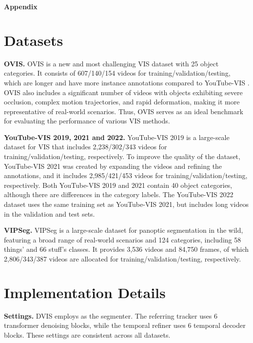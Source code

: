 \documentclass[10pt,twocolumn,letterpaper]{article}
\begin{document}
{\small


}

\clearpage
\appendix
\begin{center}{\bf \Large Appendix}\end{center}\vspace{-2mm}
\renewcommand{\thetable}{\Roman{table}}
\renewcommand{\thefigure}{\Roman{figure}}
\setcounter{table}{0}
\setcounter{figure}{0}

\section{Datasets}\label{sec:datasets}

\textbf{OVIS.} OVIS \cite{ovis} is a new and most challenging VIS dataset with 25 object categories. It consists of 607/140/154 videos for training/validation/testing, which are longer and have more instance annotations compared to YouTube-VIS \cite{masktrackrcnn}. OVIS also includes a significant number of videos with objects exhibiting severe occlusion, complex motion trajectories, and rapid deformation, making it more representative of real-world scenarios. Thus, OVIS serves as an ideal benchmark for evaluating the performance of various VIS methods.

\textbf{YouTube-VIS 2019, 2021 and 2022.} YouTube-VIS 2019 is a large-scale dataset for VIS that includes 2,238/302/343 videos for training/validation/testing, respectively. To improve the quality of the dataset, YouTube-VIS 2021 was created by expanding the videos and refining the annotations, and it includes 2,985/421/453 videos for training/validation/testing, respectively. Both YouTube-VIS 2019 and 2021 contain 40 object categories, although there are differences in the category labels. The YouTube-VIS 2022 dataset uses the same training set as YouTube-VIS 2021, but includes long videos in the validation and test sets.

\textbf{VIPSeg.} VIPSeg \cite{clippanofcn} is a large-scale dataset for panoptic segmentation in the wild, featuring a broad range of real-world scenarios and 124 categories, including 58 things’ and 66 stuff’s classes. It provides 3,536 videos and 84,750 frames, of which 2,806/343/387 videos are allocated for training/validation/testing, respectively.

\section{Implementation Details}\label{sec:implement}
\textbf{Settings.} DVIS employs \cite{mask2former} as the segmenter. The referring tracker uses 6 transformer denoising blocks, while the temporal refiner uses 6 temporal decoder blocks. These settings are consistent across all datasets.
\end{document}
